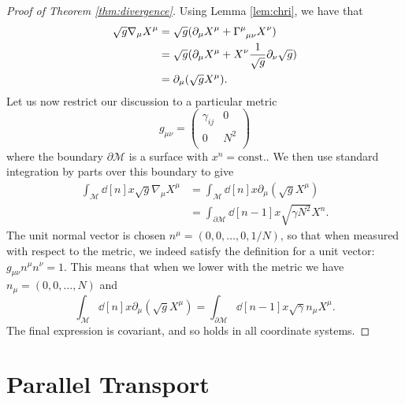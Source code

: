 
\begin{proof}[Proof of Theorem \ref{thm:divergence}]
  Using Lemma \ref{lem:chri}, we have that 
  \begin{align}
    \sqrt{g} \nabla_{\mu} X^\mu &= \sqrt{g} (\partial_\mu X^\mu + \Gamma \indices{^\mu_\mu_\nu} X^\nu) \\
				&= \sqrt{g} (\partial_\mu X^\mu + X^\nu \frac{1}{\sqrt{g}} \partial_\nu \sqrt{g}) \\
				&= \partial_\mu (\sqrt{g} X^\mu).
  \end{align}
  Let us now restrict our discussion to a particular metric
  \begin{equation}
    g_{\mu\nu} = 
    \begin{pmatrix}
     \gamma_{ij} & 0 \\
     0 & N^2 \\
    \end{pmatrix}
  \end{equation}
  where the boundary $\partial \mathcal{M}$ is a surface with $x^n = \text{const.}$.
  We then use standard integration by parts over this boundary to give
  \begin{align}
    \int_{\mathcal{M}} \dd[n]{x} \sqrt{g} \nabla_{\mu} X^\mu &= \int_{\mathcal{M}} \dd[n]{x} \partial_\mu (\sqrt{g} X^\mu) \\
							     &= \int_{\partial \mathcal{M}} \dd[n-1]{x} \sqrt{\gamma N^2} X^n.
  \end{align}
  The unit normal vector is chosen $n^\mu = (0, 0, \dots, 0, 1/N)$, so that when measured with respect to the metric, we indeed satisfy the definition for a unit vector: $g_{\mu\nu} n^\mu n^\nu = 1$. This means that when we lower with the metric we have $n_\mu = (0, 0, \dots, N)$ and 
  \begin{equation}
    \int_{\mathcal{M}} \dd[n]{x} \partial_\mu (\sqrt{g} X^\mu) = \int_{\partial \mathcal{M}} \dd[n-1]{x} \sqrt{\gamma} n_\mu X^\mu.
  \end{equation}
  The final expression is covariant, and so holds in all coordinate systems.
\end{proof}

\section{Parallel Transport}%
\label{sec:parallel_transport}

